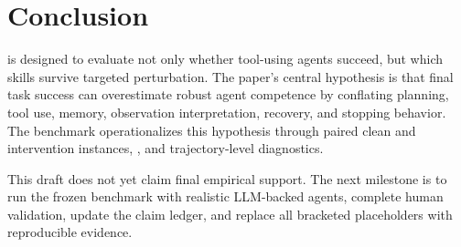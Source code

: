 \section{Conclusion}

\benchmark is designed to evaluate not only whether tool-using agents succeed, but which skills survive targeted perturbation. The paper's central hypothesis is that final task success can overestimate robust agent competence by conflating planning, tool use, memory, observation interpretation, recovery, and stopping behavior. The benchmark operationalizes this hypothesis through paired clean and intervention instances, \acrs, and trajectory-level diagnostics.

This draft does not yet claim final empirical support. The next milestone is to run the frozen benchmark with realistic LLM-backed agents, complete human validation, update the claim ledger, and replace all bracketed placeholders with reproducible evidence.
